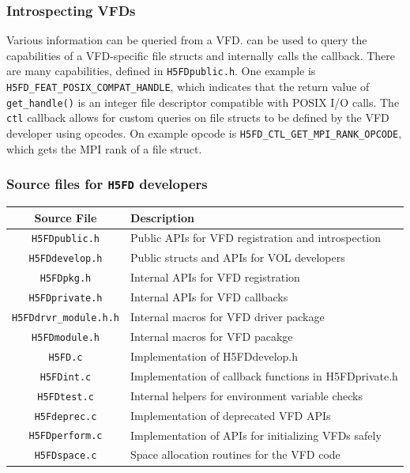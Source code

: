 \subsubsection{Introspecting VFDs}

Various information can be queried from a VFD.  can be used to query the capabilities of a VFD-specific file structs and internally calls the  callback. There are many capabilities, defined in \texttt{H5FDpublic.h}. One example is \texttt{H5FD\_FEAT\_POSIX\_COMPAT\_HANDLE}, which indicates that the return value of \texttt{get\_handle()} is an integer file descriptor compatible with POSIX I/O calls. The \texttt{ctl} callback allows for custom queries on file structs to be defined by the VFD developer using opcodes. On example opcode is \texttt{H5FD\_CTL\_GET\_MPI\_RANK\_OPCODE}, which gets the MPI rank of a file struct.

\subsubsection{Source files for \texttt{H5FD} developers}

\begin{table}[!ht]
\begin{tabular}{||c|l||}
\hline
\textbf{Source File} & \textbf{Description} \\  [0.5ex]
\hline\hline
\texttt{H5FDpublic.h} & Public APIs for VFD registration and introspection \\
\texttt{H5FDdevelop.h} & Public structs and APIs for VOL developers \\
\texttt{H5FDpkg.h} & Internal APIs for VFD registration \\
\texttt{H5FDprivate.h} & Internal APIs for VFD callbacks \\
\texttt{H5FDdrvr_module.h.h} & Internal macros for VFD driver package \\
\texttt{H5FDmodule.h} & Internal macros for VFD pacakge \\
\texttt{H5FD.c} & Implementation of H5FDdevelop.h \\
\texttt{H5FDint.c} & Implementation of callback functions in H5FDprivate.h \\
\texttt{H5FDtest.c} & Internal helpers for environment variable checks \\
\texttt{H5Fdeprec.c} & Implementation of deprecated VFD APIs \\
\texttt{H5FDperform.c} & Implementation of APIs for initializing VFDs safely \\
\texttt{H5FDspace.c} & Space allocation routines for the VFD code \\
\hline
\end{tabular}
\label{table:VFD_src_files}
\end{table}


